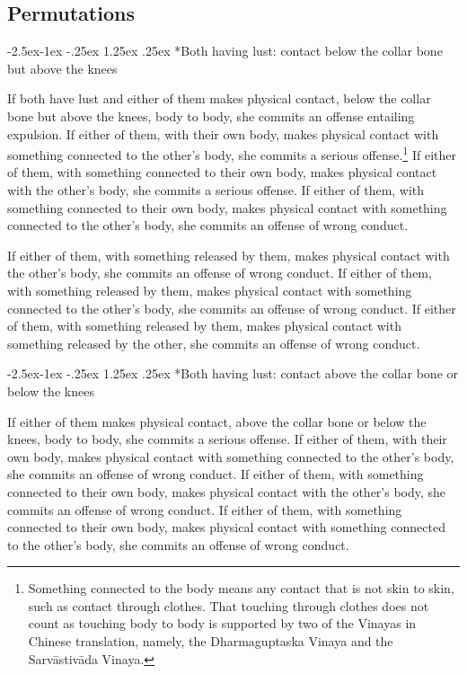 \documentclass[12pt,openany]{book}%
\makeatletter
\renewcommand\subparagraph{\@startsection{subparagraph}{5}{\z@}%
            {-2.5ex\@plus -1ex \@minus -.25ex}%
            {1.25ex \@plus .25ex}%
            {\noindent\normalfont\itshape\footnotesize}}
\makeatother
\begin{document}
\subsection*{Permutations }

\subparagraph*{Both having lust: contact below the collar bone but above the knees }

If both have lust and either of them makes physical contact, below the collar bone but above the knees, body to body, she commits an offense entailing expulsion. If either of them, with their own body, makes physical contact with something connected to the other’s body, she commits a serious offense.\footnote{Something connected to the body means any contact that is not skin to skin, such as contact through clothes. That touching through clothes does not count as touching body to body is supported by two of the Vinayas in Chinese translation, namely, the Dharmaguptaska Vinaya and the \textsanskrit{Sarvāstivāda} Vinaya. } If either of them, with something connected to their own body, makes physical contact with the other’s body, she commits a serious offense. If either of them, with something connected to their own body, makes physical contact with something connected to the other’s body, she commits an offense of wrong conduct. 

If either of them, with something released by them, makes physical contact with the other’s body, she commits an offense of wrong conduct. If either of them, with something released by them, makes physical contact with something connected to the other’s body, she commits an offense of wrong conduct. If either of them, with something released by them, makes physical contact with something released by the other, she commits an offense of wrong conduct. 

\subparagraph*{Both having lust: contact above the collar bone or below the knees }

If either of them makes physical contact, above the collar bone or below the knees, body to body, she commits a serious offense. If either of them, with their own body, makes physical contact with something connected to the other’s body, she commits an offense of wrong conduct. If either of them, with something connected to their own body, makes physical contact with the other’s body, she commits an offense of wrong conduct. If either of them, with something connected to their own body, makes physical contact with something connected to the other’s body, she commits an offense of wrong conduct. 
\end{document}
